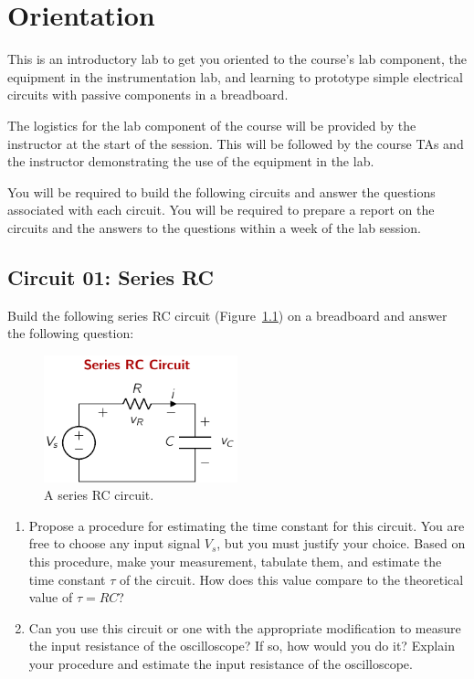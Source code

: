 \chapter{Orientation}\label{expt:01-lab-equp}

This is an introductory lab to get you oriented to the course's lab component, the equipment in the instrumentation lab, and learning to prototype simple electrical circuits with passive components in a breadboard. 

The logistics for the lab component of the course will be provided by the instructor at the start of the session. This will be followed by the course TAs and the instructor demonstrating the use of the equipment in the lab.

You will be required to build the following circuits and answer the questions associated with each circuit. You will be required to prepare a report on the circuits and the answers to the questions within a week of the lab session.

\section{Circuit 01: Series RC}
Build the following series RC circuit (Figure~\ref{fig:expt01-01}) on a breadboard and answer the following question:
\begin{figure}[htbp]
    \centering
    \includegraphics[width=0.5\textwidth]{figures/expt01/expt01-01.pdf}
    \caption{A series RC circuit.}
    \label{fig:expt01-01}
\end{figure}
\begin{enumerate}
    \item Propose a procedure for estimating the time constant for this circuit. You are free to choose any input signal $V_s$, but you must justify your choice. Based on this procedure, make your measurement, tabulate them, and estimate the time constant $\tau$ of the circuit. How does this value compare to the theoretical value of $\tau = RC$?
    \item Can you use this circuit or one with the appropriate modification to measure the input resistance of the oscilloscope? If so, how would you do it? Explain your procedure and estimate the input resistance of the oscilloscope.
\end{enumerate}

